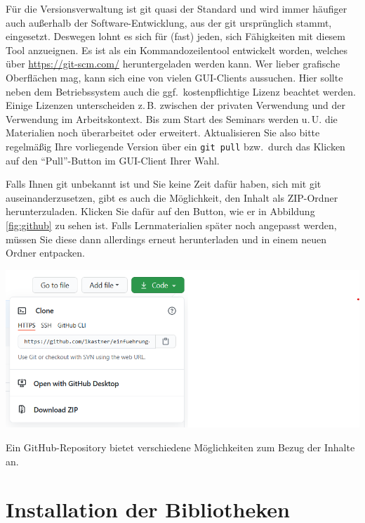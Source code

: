 \documentclass{tufte-handout}
\begin{document}
Für die Versionsverwaltung ist git quasi der Standard und wird immer häufiger auch außerhalb der Software-Entwicklung, aus der git ursprünglich stammt, eingesetzt.
Deswegen lohnt es sich für (fast) jeden, sich Fähigkeiten mit diesem Tool anzueignen.
Es ist als ein Kommandozeilentool entwickelt worden, welches über \url{https://git-scm.com/} heruntergeladen werden kann.
Wer lieber grafische Oberflächen mag, kann sich eine von vielen GUI-Clients%
aussuchen.
Hier sollte neben dem Betriebssystem auch die ggf.\ kostenpflichtige Lizenz beachtet werden.
Einige Lizenzen unterscheiden z.\,B. zwischen der privaten Verwendung und der Verwendung im Arbeitskontext.
Bis zum Start des Seminars werden u.\,U. die Materialien noch überarbeitet oder erweitert.
Aktualisieren Sie also bitte regelmäßig Ihre vorliegende Version über ein \texttt{git pull} bzw.\ durch das Klicken auf den \enquote{Pull}-Button im GUI-Client Ihrer Wahl.

Falls Ihnen git unbekannt ist und Sie keine Zeit dafür haben, sich mit git auseinanderzusetzen, gibt es auch die Möglichkeit, den Inhalt als ZIP-Ordner herunterzuladen.
Klicken Sie dafür auf den Button, wie er in Abbildung\,\ref{fig:github} zu sehen ist.
Falls Lernmaterialien später noch angepasst werden, müssen Sie diese dann allerdings erneut herunterladen und in einem neuen Ordner entpacken.

\begin{marginfigure}
  \includegraphics{github-zip}
  \caption{Ein GitHub-Repository bietet verschiedene Möglichkeiten zum Bezug der Inhalte an.}%
\label{fig:github}
\end{marginfigure}


\section{Installation der Bibliotheken}
\end{document}
